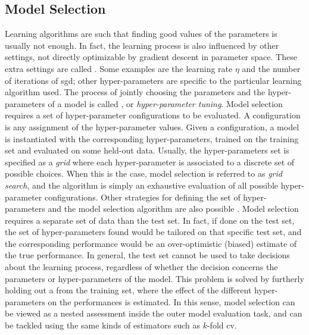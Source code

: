 \subsection{Model Selection}
Learning algorithms are such that finding good values of the parameters is usually not enough. In fact, the learning process is also influenced by other settings, not directly optimizable by gradient descent in parameter space. These extra settings are called . Some examples are the learning rate $\eta$ and the number of iterations of \gls{sgd}; other hyper-parameters are specific to the particular learning algorithm used. The process of jointly choosing the parameters and the hyper-parameters of a model is called , or \emph{hyper-parameter tuning}. Model selection requires a set of hyper-parameter configurations to be evaluated. A configuration is any assignment of the hyper-parameter values. Given a configuration, a model is instantiated with the corresponding hyper-parameters, trained on the training set and evaluated on some held-out data. Usually, the hyper-parameters set is specified as a \emph{grid} where each hyper-parameter is associated to a discrete set of possible choices. When this is the case, model selection is referred to as \emph{grid search}, and the algorithm is simply an exhaustive evaluation of all possible hyper-parameter configurations. Other strategies for defining the set of hyper-parameters and the model selection algorithm are also possible \citep{bergstra2009randomsearch,bergstra2012hyperopt}. Model selection requires a separate set of data than the test set. In fact, if done on the test set, the set of hyper-parameters found would be tailored on that specific test set, and the corresponding performance would be an over-optimistic (biased) estimate of the true performance. In general, the test set cannot be used to take decisions about the learning process, regardless of whether the decision concerns the parameters or hyper-parameters of the model. This problem is solved by furtherly holding out a  from the training set, where the effect of the different hyper-parameters on the performances is estimated. In this sense, model selection can be viewed as a nested assessment inside the outer model evaluation task, and can be tackled using the same kinds of estimators such as $k$-fold \gls{cv}.

